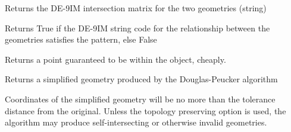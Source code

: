 \documentclass[letterpaper,10pt,english]{sphinxmanual}
\begin{document}
\begin{fulllineitems}

\begin{fulllineitems}
\label{\detokenize{reference:taipanPyRouter.ESegment.relate}}
Returns the DE-9IM intersection matrix for the two geometries
(string)

\end{fulllineitems}


\begin{fulllineitems}
\label{\detokenize{reference:taipanPyRouter.ESegment.relate_pattern}}
Returns True if the DE-9IM string code for the relationship between
the geometries satisfies the pattern, else False

\end{fulllineitems}


\begin{fulllineitems}
\label{\detokenize{reference:taipanPyRouter.ESegment.representative_point}}
Returns a point guaranteed to be within the object, cheaply.

\end{fulllineitems}


\begin{fulllineitems}
\label{\detokenize{reference:taipanPyRouter.ESegment.simplify}}
Returns a simplified geometry produced by the Douglas-Peucker
algorithm

Coordinates of the simplified geometry will be no more than the
tolerance distance from the original. Unless the topology preserving
option is used, the algorithm may produce self-intersecting or
otherwise invalid geometries.

\end{fulllineitems}



\end{fulllineitems}
\end{document}
